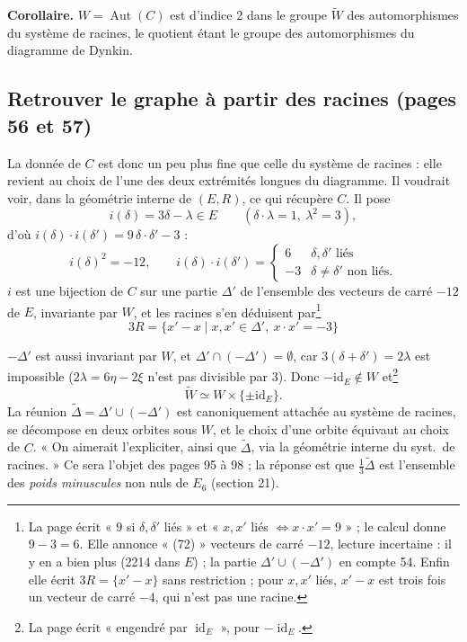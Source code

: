 \documentclass[11pt,a4paper]{article}
\begin{document}
\textbf{Corollaire.} $W = \operatorname{Aut}(C)$ est d'indice 2 dans le groupe
$\widetilde W$ des automorphismes du système de racines, le quotient étant le
groupe des automorphismes du diagramme de Dynkin.

\subsection*{Retrouver le graphe à partir des racines (pages 56 et 57)}

La donnée de $C$ est donc un peu plus fine que celle du système de racines :
elle revient au choix de l'une des deux extrémités longues du diagramme. Il
voudrait voir, dans la géométrie interne de $(E, R)$, ce qui récupère $C$. Il
pose
\[
i(\delta) = 3\delta - \lambda \in E \qquad (\delta \cdot \lambda = 1, \ \lambda^2 = 3),
\]
d'où $i(\delta) \cdot i(\delta') = 9\, \delta\cdot\delta' - 3$ :
\[
i(\delta)^2 = -12, \qquad i(\delta) \cdot i(\delta') = \begin{cases} 6 &
\delta, \delta' \text{ liés} \\ -3 & \delta \neq \delta' \text{ non
liés.}\end{cases}
\]
$i$ est une bijection de $C$ sur une partie $\Delta'$ de l'ensemble des
vecteurs de carré $-12$ de $E$, invariante par $W$, et les racines s'en
déduisent par\footnote{La page écrit « $9$ si $\delta, \delta'$ liés » et « $x, x'$ liés
$\iff x \cdot x' = 9$ » ; le calcul donne $9 - 3 = 6$. Elle annonce
« (72) » vecteurs de carré $-12$, lecture incertaine : il y en a bien plus
(2214 dans $E$) ; la partie $\Delta' \cup (-\Delta')$ en compte 54. Enfin elle
écrit $3R = \lbrace x' - x\rbrace$ sans restriction ; pour $x, x'$ liés,
$x' - x$ est trois fois un vecteur de carré $-4$, qui n'est pas une
racine.}
\[
3R = \lbrace x' - x \mid x, x' \in \Delta', \ x \cdot x' = -3\rbrace
\]


$-\Delta'$ est aussi invariant par $W$, et $\Delta' \cap (-\Delta') =
\emptyset$, car $3(\delta + \delta') = 2\lambda$ est impossible ($2\lambda =
6\eta - 2\xi$ n'est pas divisible par 3). Donc $-\mathrm{id}_E \notin W$ et\footnote{La page écrit « engendré par
$\operatorname{id}_E$ », pour $-\operatorname{id}_E$.}
\[
\widetilde W \simeq W \times \lbrace \pm \mathrm{id}_E\rbrace .
\]
La réunion $\widetilde\Delta = \Delta' \cup
(-\Delta')$ est canoniquement attachée au système de racines, se décompose en
deux orbites sous $W$, et le choix d'une orbite équivaut au choix de $C$. « On
aimerait l'expliciter, ainsi que $\widetilde\Delta$, via la géométrie interne
du syst.\ de racines. » Ce sera l'objet des pages 95 à 98 ; la réponse est
que $\tfrac13 \widetilde\Delta$ est l'ensemble des \emph{poids minuscules} non
nuls de $E_6$ (section 21).
\end{document}
